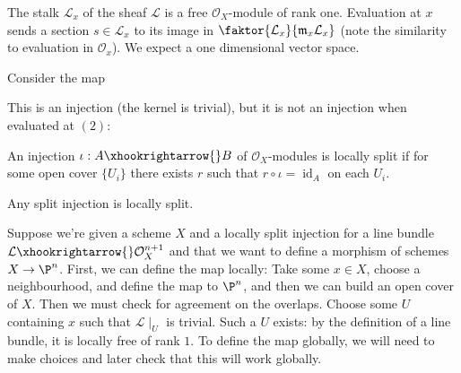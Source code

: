 The stalk $\mathcal{L}_x$ of the sheaf $\mathcal{L}$ is a free $\mathcal{O}_X$-module of rank one.
Evaluation at $x$ sends a section $s\in\mathcal{L}_x$ to its image in $\faktor{\mathcal{L}_x}{\frak{m}_x\mathcal{L}_x}$ (note the similarity to evaluation in $\mathcal{O}_x$).
We expect a one dimensional vector space.

\begin{nonexample}
    Consider the map 
    \begin{figure}[H]
        \centering
    \end{figure}

    This is an injection (the kernel is trivial), but it is not an injection when evaluated at $(2)$:
    \begin{figure}[H]
        \centering
    \end{figure}
\end{nonexample}

\begin{definition}
    An injection $\iota:A\xhookrightarrow{}B$ of $\mathcal{O}_X$-modules is locally split if for some open cover $\{U_i\}$ there exists $r$ such that $r\circ\iota=\operatorname{id}_A$ on each $U_i$.
\end{definition}
\begin{example}
    Any split injection is locally split.
\end{example}

Suppose we're given a scheme $X$ and a locally split injection for a line bundle $\mathcal{L}\xhookrightarrow{}\mathcal{O}_X^{n+1}$ and that we want to define a morphism of schemes $X\to\P^n$.
First, we can define the map locally:
Take some $x\in X$, choose a neighbourhood, and define the map to $\P^n$, and then we can build an open cover of $X$.
Then we must check for agreement on the overlaps.
Choose some $U$ containing $x$ such that $\mathcal{L}\mid_U$ is trivial.
Such a $U$ exists: by the definition of a line bundle, it is locally free of rank $1$.
To define the map globally, we will need to make choices and later check that this will work globally.


